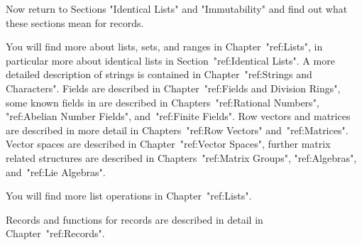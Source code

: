 Now return to Sections "Identical Lists"  and "Immutability" and find out
what these sections mean for records.


% 
% 
You will find more about lists, sets, and ranges in Chapter~"ref:Lists",
in particular more about identical lists in Section~"ref:Identical Lists".
% 
% 
% 
A more detailed description of strings is contained in
Chapter~"ref:Strings and Characters".
% 
% 
Fields are described in Chapter~"ref:Fields and Division Rings", some
known fields in {\GAP} are described in Chapters~"ref:Rational
Numbers", "ref:Abelian Number Fields", and~"ref:Finite Fields".  Row
vectors and matrices are described in more detail in Chapters~"ref:Row
Vectors" and~"ref:Matrices".  Vector spaces are described in
Chapter~"ref:Vector Spaces", further matrix related structures are
described in Chapters~"ref:Matrix Groups", "ref:Algebras",
and~"ref:Lie Algebras".
% 

% 
You will find more list operations in Chapter~"ref:Lists".

Records and functions for records are described in detail
in Chapter~"ref:Records".


